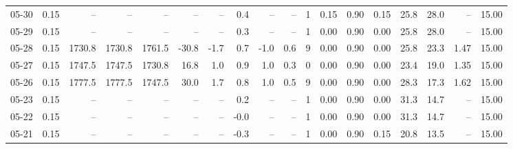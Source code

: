 \begin{threeparttable}
{\begin{tabular}{lrrrrrrrrrrrrrrrrr}
  05-30 &     0.15 &     -- &     -- &     -- &         -- &             -- &                       0.4 &                       -- &                  -- &              1 &       0.15 &      0.90 &           0.15 &             25.8 &                28.0 &              -- &                  15.00 \\
  05-29 &     0.15 &     -- &     -- &     -- &         -- &             -- &                       0.3 &                       -- &                  -- &              1 &       0.00 &      0.90 &           0.00 &             25.8 &                28.0 &              -- &                  15.00 \\
  05-28 &     0.15 & 1730.8 & 1730.8 & 1761.5 &      -30.8 &           -1.7 &                       0.7 &                     -1.0 &                 0.6 &              9 &       0.00 &      0.90 &           0.00 &             25.8 &                23.3 &            1.47 &                  15.00 \\
  05-27 &     0.15 & 1747.5 & 1747.5 & 1730.8 &       16.8 &            1.0 &                       0.9 &                      1.0 &                 0.3 &              0 &       0.00 &      0.90 &           0.00 &             23.4 &                19.0 &            1.35 &                  15.00 \\
  05-26 &     0.15 & 1777.5 & 1777.5 & 1747.5 &       30.0 &            1.7 &                       0.8 &                      1.0 &                 0.5 &              9 &       0.00 &      0.90 &           0.00 &             28.3 &                17.3 &            1.62 &                  15.00 \\
  05-23 &     0.15 &     -- &     -- &     -- &         -- &             -- &                       0.2 &                       -- &                  -- &              1 &       0.00 &      0.90 &           0.00 &             31.3 &                14.7 &              -- &                  15.00 \\
  05-22 &     0.15 &     -- &     -- &     -- &         -- &             -- &                      -0.0 &                       -- &                  -- &              1 &       0.00 &      0.90 &           0.00 &             31.3 &                14.7 &              -- &                  15.00 \\
  05-21 &     0.15 &     -- &     -- &     -- &         -- &             -- &                      -0.3 &                       -- &                  -- &              1 &       0.00 &      0.90 &           0.15 &             20.8 &                13.5 &              -- &                  15.00 \\

\end{tabular}}
\end{threeparttable}
